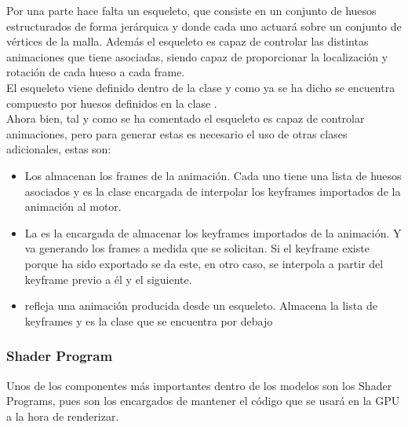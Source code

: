 Por una parte hace falta un esqueleto, que consiste en un conjunto de huesos estructurados de forma jerárquica y donde cada uno actuará sobre un conjunto de vértices de la malla. Además el esqueleto es capaz de controlar las distintas animaciones que tiene asociadas, siendo capaz de proporcionar la localización y rotación de cada hueso a cada frame.\\
El esqueleto viene definido dentro de la clase \rorefskeleton y como ya se ha dicho se encuentra compuesto por huesos definidos en la clase \rorefbone.\\

Ahora bien, tal y como se ha comentado el esqueleto es capaz de controlar animaciones, pero para generar estas es necesario el uso de otras clases adicionales, estas son:

\begin{itemize}
\item Los \rorefframe almacenan los frames de la animación. Cada uno tiene una lista de huesos asociados y es la clase encargada de interpolar los keyframes importados de la animación al motor. 
\item La \rorefkeyframelist es la encargada de almacenar los keyframes importados de la animación. Y va generando los frames a medida que se solicitan. Si el keyframe existe porque ha sido exportado se da este, en otro caso, se interpola a partir del keyframe previo a él y el siguiente.
\item \rorefskeletalaction refleja una animación producida desde un esqueleto. Almacena la lista de keyframes y es la clase que se encuentra por debajo  
\end{itemize}

\subsubsection{Shader Program}
Unos de los componentes más importantes dentro de los modelos son los Shader Programs, pues son los encargados de mantener el código que se usará en la GPU a la hora de renderizar.

